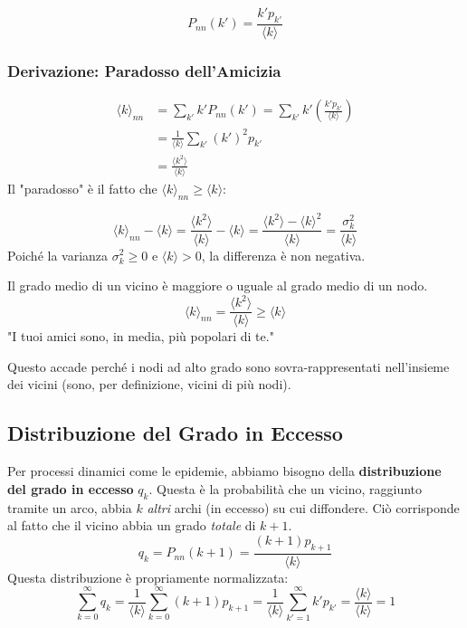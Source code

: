 \begin{equation} \label{eq:nn_dist}
P_{nn}(k') = \frac{k' p_{k'}}{\langle k \rangle}
\end{equation}


\subsubsection{Derivazione: Paradosso dell'Amicizia}
\begin{align*}
\langle k \rangle_{nn} &= \sum_{k'} k' P_{nn}(k') = \sum_{k'} k' \left( \frac{k' p_{k'}}{\langle k \rangle} \right) \\
&= \frac{1}{\langle k \rangle} \sum_{k'} (k')^2 p_{k'} \\
&= \frac{\langle k^2 \rangle}{\langle k \rangle}
\end{align*}
Il "paradosso" è il fatto che $\langle k \rangle_{nn} \ge \langle k \rangle$:

$$ \langle k \rangle_{nn} - \langle k \rangle = \frac{\langle k^2 \rangle}{\langle k \rangle} - \langle k \rangle = \frac{\langle k^2 \rangle - \langle k \rangle^2}{\langle k \rangle} = \frac{\sigma_k^2}{\langle k \rangle} $$
Poiché la varianza $\sigma_k^2 \ge 0$ e $\langle k \rangle > 0$, la differenza è non negativa.


\begin{tcolorbox}[colback=colorA!15,colframe=colorB!75!colorA,title=Paradosso dell'Amicizia]
Il grado medio di un vicino è maggiore o uguale al grado medio di un nodo.
\begin{equation} \label{eq:knn}
\langle k \rangle_{nn} = \frac{\langle k^2 \rangle}{\langle k \rangle} \ge \langle k \rangle
\end{equation}
"I tuoi amici sono, in media, più popolari di te."
\end{tcolorbox}
Questo accade perché i nodi ad alto grado sono sovra-rappresentati nell'insieme dei vicini (sono, per definizione, vicini di più nodi).

\subsection{Distribuzione del Grado in Eccesso}
Per processi dinamici come le epidemie, abbiamo bisogno della \textbf{distribuzione del grado in eccesso} $q_k$. Questa è la probabilità che un vicino, raggiunto tramite un arco, abbia $k$ \textit{altri} archi (in eccesso) su cui diffondere.
Ciò corrisponde al fatto che il vicino abbia un grado \textit{totale} di $k+1$.
\begin{equation} \label{eq:excess_deg}
q_k = P_{nn}(k+1) = \frac{(k+1) p_{k+1}}{\langle k \rangle}
\end{equation}
Questa distribuzione è propriamente normalizzata: $$\sum_{k=0}^\infty q_k = \frac{1}{\langle k \rangle} \sum_{k=0}^\infty (k+1) p_{k+1} = \frac{1}{\langle k \rangle} \sum_{k'=1}^\infty k' p_{k'} = \frac{\langle k \rangle}{\langle k \rangle} = 1$$

